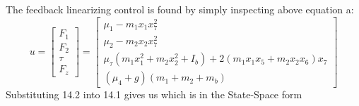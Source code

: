 \documentclass{UoNMCHA}
\numberwithin{equation}{section}
\begin{document}
The feedback linearizing control is found by simply inspecting above equation a:
$$
u=\left[\begin{array}{c}
F_{1} \\
F_{2} \\
\tau \\
F_{z}
\end{array}\right]=\left[\begin{array}{c}
\mu_{1}-m_{1} x_{1} x_{7}^{2} \\
\mu_{2}-m_{2} x_{2} x_{7}^{2} \\
\mu_{\tau}\left(m_{1} x_{1}^{2}+m_{2} x_{2}^{2}+I_{b}\right)+2\left(m_{1} x_{1} x_{5}+m_{2} x_{2} x_{6}\right) x_{7} \\
\left(\mu_{4}+g\right)\left(m_{1}+m_{2}+m_{b}\right)
\end{array}\right]
$$
Substituting 14.2 into 14.1 gives us which is in the State-Space form
\end{document}
